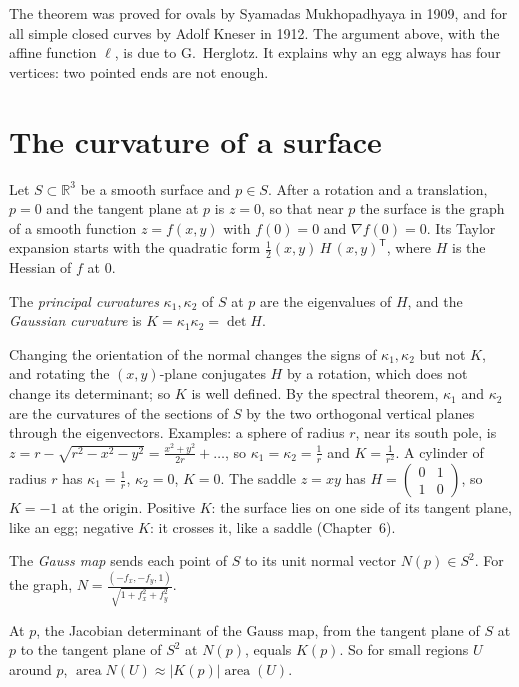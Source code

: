 The theorem was proved for ovals by Syamadas Mukhopadhyaya in 1909, and for all simple closed curves by Adolf Kneser in 1912. The argument above, with the
affine function $\ell$, is due to G.~Herglotz. It explains why an egg always has four vertices: two pointed ends are not enough.

\section{The curvature of a surface}

Let $S\subset\mathbb R^3$ be a smooth surface and $p\in S$. After a rotation and a translation, $p=0$ and the tangent plane at $p$ is $z=0$, so that near $p$ the
surface is the graph of a smooth function $z=f(x,y)$ with $f(0)=0$ and $\nabla f(0)=0$. Its Taylor expansion starts with the quadratic form
$\frac12(x,y)\,H\,(x,y)^{\mathsf T}$, where $H$ is the Hessian of $f$ at $0$.

\begin{definition}
The \emph{principal curvatures} $\kappa_1,\kappa_2$ of $S$ at $p$ are the eigenvalues of $H$, and the \emph{Gaussian curvature} is $K=\kappa_1\kappa_2=\det H$.
\end{definition}

Changing the orientation of the normal changes the signs of $\kappa_1,\kappa_2$ but not $K$, and rotating the $(x,y)$-plane conjugates $H$ by a rotation, which does not
change its determinant; so $K$ is well defined. By the spectral theorem, $\kappa_1$ and $\kappa_2$ are the curvatures of the sections of $S$ by the two orthogonal vertical
planes through the eigenvectors. Examples: a sphere of radius $r$, near its south pole, is $z=r-\sqrt{r^2-x^2-y^2}=\frac{x^2+y^2}{2r}+\dots$, so $\kappa_1=\kappa_2=\frac1r$
and $K=\frac1{r^2}$. A cylinder of radius $r$ has $\kappa_1=\frac1r$, $\kappa_2=0$, $K=0$. The saddle $z=xy$ has $H=\begin{pmatrix}0&1\\1&0\end{pmatrix}$, so $K=-1$ at
the origin. Positive $K$: the surface lies on one side of its tangent plane, like an egg; negative $K$: it crosses it, like a saddle (Chapter~6).

The \emph{Gauss map} sends each point of $S$ to its unit normal vector $N(p)\in S^2$. For the graph,
$N=\frac{(-f_x,-f_y,1)}{\sqrt{1+f_x^2+f_y^2}}$.

\begin{proposition}\label{prop:gaussmap}
At $p$, the Jacobian determinant of the Gauss map, from the tangent plane of $S$ at $p$ to the tangent plane of $S^2$ at $N(p)$, equals $K(p)$. So for small regions
$U$ around $p$, $\operatorname{area}N(U)\approx|K(p)|\operatorname{area}(U)$.
\end{proposition}

